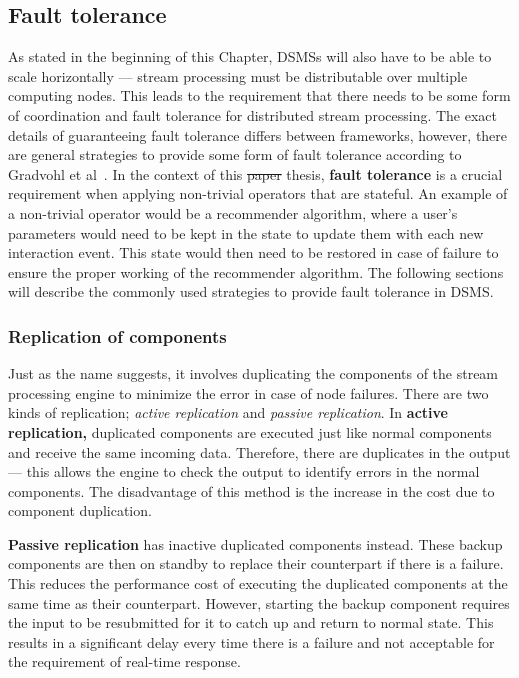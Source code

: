 \subsection{Fault tolerance}
As stated in the beginning of this Chapter, DSMSs will also have to be able to scale 
horizontally --- stream processing must be distributable over multiple computing nodes. 
This leads to the requirement that there needs to be some form of coordination and fault tolerance 
for distributed stream processing. The exact details of guaranteeing fault tolerance differs between frameworks, however, there are general strategies to provide some 
form of fault tolerance according to Gradvohl et al~\cite{fault_tolerance_dsms}.
In the context of this \sout{paper} thesis, \textbf{fault tolerance} is a crucial requirement when applying
non-trivial operators that are stateful. 
An example of a non-trivial operator would be a recommender algorithm, where 
a user's parameters would need to be kept in the state to update them with each new 
interaction event. This state would then need to be restored in case of failure to 
ensure the proper working of the recommender algorithm.
The following sections will describe the commonly used strategies to provide fault tolerance 
in DSMS. 

\subsubsection{Replication of components}
Just as the name suggests, it involves duplicating the components of the stream processing
engine to minimize the error in case of node failures. There are two kinds of replication; 
\emph{active replication} and \emph{passive replication}. In \textbf{active replication,}
duplicated components are executed just like normal components and receive the same incoming data. 
Therefore, there are duplicates in the output --- this allows the engine to check the 
output to identify errors in the normal components. The disadvantage of this method is 
the increase in the cost due to component duplication. 

\textbf{Passive replication} has inactive duplicated components instead. These backup
components are then on standby to replace their counterpart if there is a failure. This 
reduces the performance cost of executing the duplicated components at the same 
time as their counterpart. However, starting the backup component requires the input 
to be resubmitted for it to catch up and return to normal state. This results in a significant 
delay every time there is a failure and not acceptable for the requirement of real-time response. 

